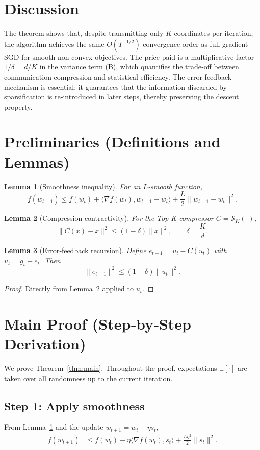 \documentclass{article}
\newtheorem{lemma}{Lemma}
\newcommand{\topk}[1]{\mathcal{S}_K(#1)} %
\newcommand{\E}{\mathbb{E}}
\begin{document}
\section*{Discussion}
The theorem shows that, despite transmitting only $K$ coordinates per iteration, the algorithm achieves the same $O(T^{-1/2})$ convergence order as full‑gradient SGD for smooth non‑convex objectives. The price paid is a multiplicative factor $1/\delta= d/K$ in the variance term (B), which quantifies the trade‑off between communication compression and statistical efficiency. The error‑feedback mechanism is essential: it guarantees that the information discarded by sparsification is re‑introduced in later steps, thereby preserving the descent property.

\newpage
\section*{Preliminaries (Definitions and Lemmas)}
\begin{lemma}[Smoothness inequality]\label{lem:smooth}
For an $L$‑smooth function,
\[
    f(w_{t+1})\le f(w_t)+\langle\nabla f(w_t),w_{t+1}-w_t\rangle+\frac{L}{2}\|w_{t+1}-w_t\|^2 .
\]
\end{lemma}
\begin{lemma}[Compression contractivity]\label{lem:contract}
For the Top‑K compressor $C=\topk{\cdot}$,
\[
    \|C(x)-x\|^2 \le (1-\delta)\|x\|^2,\qquad\delta=\frac{K}{d}.
\]
\end{lemma}
\begin{lemma}[Error‑feedback recursion]\label{lem:ef}
Define $e_{t+1}=u_t-C(u_t)$ with $u_t=g_t+e_t$. Then
\[
    \|e_{t+1}\|^2 \le (1-\delta)\|u_t\|^2 .
\]
\end{lemma}
\begin{proof}
Directly from Lemma~\ref{lem:contract} applied to $u_t$.
\end{proof}

\section*{Main Proof (Step‑by‑Step Derivation)}
We prove Theorem~\ref{thm:main}.  Throughout the proof, expectations $\E[\cdot]$ are taken over all randomness up to the current iteration.

\subsection*{Step 1: Apply smoothness}
From Lemma~\ref{lem:smooth} and the update $w_{t+1}=w_t-\eta s_t$,
\[
\begin{aligned}
f(w_{t+1})
&\le f(w_t)-\eta\langle\nabla f(w_t),s_t\rangle+\frac{L\eta^2}{2}\|s_t\|^2 .
\end{aligned}
\tag{2}
\]
\end{document}
